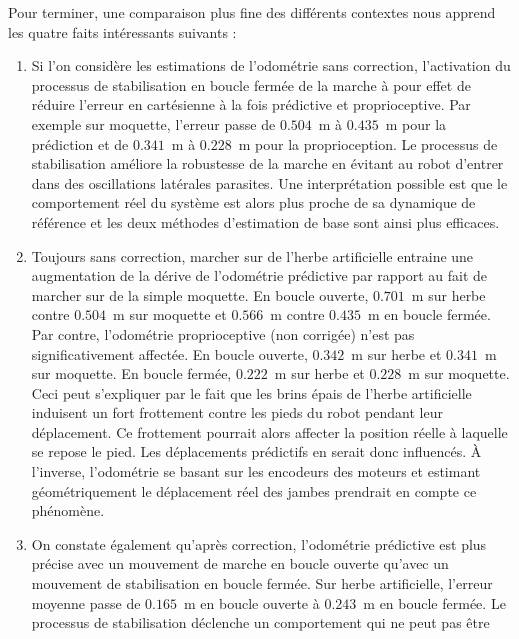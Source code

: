 Pour terminer, une comparaison plus fine des différents contextes nous apprend 
les quatre faits intéressants suivants :
\begin{enumerate}
    \item Si l'on considère les estimations de l'odométrie sans correction, 
        l'activation du processus de stabilisation en boucle fermée de la marche à pour effet 
        de réduire l'erreur en cartésienne à la fois prédictive et proprioceptive.
        Par exemple sur moquette, l'erreur passe de $0.504$~m à $0.435$~m pour la prédiction
        et de $0.341$~m à $0.228$~m pour la proprioception.
        Le processus de stabilisation améliore la robustesse de la marche en évitant 
        au robot d'entrer dans des oscillations latérales parasites.
        Une interprétation possible est que le comportement réel du système est alors plus proche 
        de sa dynamique de référence et les deux méthodes d'estimation 
        de base sont ainsi plus efficaces.
    \item Toujours sans correction, marcher sur de l'herbe artificielle 
        entraine une augmentation de la dérive de l'odométrie prédictive par rapport au fait de
        marcher sur de la simple moquette.
        En boucle ouverte, $0.701$~m sur herbe contre $0.504$~m sur moquette et 
        $0.566$~m contre $0.435$~m en boucle fermée.
        Par contre, l'odométrie proprioceptive (non corrigée) n'est pas 
        significativement affectée.
        En boucle ouverte, $0.342$~m sur herbe et $0.341$~m sur moquette.
        En boucle fermée, $0.222$~m sur herbe et $0.228$~m sur moquette.
        Ceci peut s'expliquer par le fait que les brins épais de l'herbe artificielle
        induisent un fort frottement contre les pieds du robot pendant leur déplacement.
        Ce frottement pourrait alors affecter la position réelle à laquelle se repose le pied.
        Les déplacements prédictifs en serait donc influencés.
        À l'inverse, l'odométrie se basant sur les encodeurs des moteurs et estimant géométriquement
        le déplacement réel des jambes prendrait en compte ce phénomène.
    \item On constate également qu'après correction, l'odométrie prédictive
        est plus précise avec un mouvement de marche en boucle ouverte qu'avec un mouvement
        de stabilisation en boucle fermée.
        Sur herbe artificielle, l'erreur moyenne passe de $0.165$~m en boucle ouverte 
        à $0.243$~m en boucle fermée.
        Le processus de stabilisation déclenche un comportement qui ne peut pas être 

\end{enumerate}
